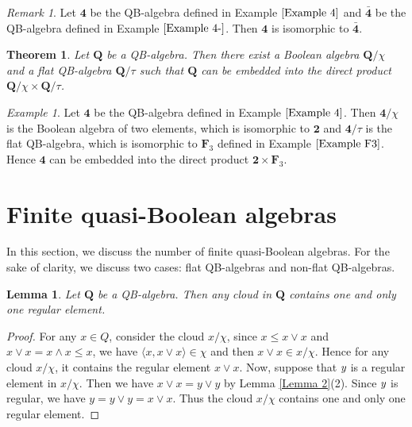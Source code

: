 \documentclass[12pt]{amsart}
\newtheorem{theorem}{Theorem}[section]
\newtheorem{lemma}{Lemma}[section]
\theoremstyle{definition}
\theoremstyle{remark}
\newtheorem{remark}{Remark}[section]
\newtheorem{example}{Example}[section]
\numberwithin{equation}{section}
\begin{document}
\begin{remark}
Let $\mathbf{4}$ be the QB-algebra defined in Example $\ref{Example 4}$ and $\bar{\mathbf{4}}$ be the QB-algebra defined in Example $\ref{Example 4-}$. Then $\mathbf{4}$ is isomorphic to $\bar{\mathbf{4}}$.
\end{remark}

\begin{theorem}\label{Theorem 1}\emph{\cite{QB}}
Let $\mathbf{Q}$ be a QB-algebra. Then there exist a Boolean algebra $\mathbf{Q}/ \chi$ and a flat QB-algebra $\mathbf{Q}/ \tau$ such that $\mathbf{Q}$ can be embedded into the direct product $\mathbf{Q}/ \chi \times \mathbf{Q}/ \tau$.
\end{theorem}


\begin{example}\label{Example 3}
Let $\mathbf{4}$ be the QB-algebra defined in Example $\ref{Example 4}$. Then $\mathbf{4}/ \chi$ is the Boolean algebra of two elements, which is isomorphic to $\mathbf{2}$ and $\mathbf{4}/\tau$ is the flat QB-algebra, which is isomorphic to $\mathbf{F}_{3}$ defined in Example $\ref{Example F3}$. Hence $\mathbf{4}$ can be embedded into the direct product $\mathbf{2}\times \mathbf{F}_{3}$.
\end{example}



\section{Finite quasi-Boolean algebras}

In this section, we discuss the number of finite quasi-Boolean algebras. For the sake of clarity, we discuss two cases: flat QB-algebras and non-flat QB-algebras.

\begin{lemma}\label{Lemma Cloud}
Let $\mathbf{Q}$ be a QB-algebra. Then any cloud in $\mathbf{Q}$ contains one and only one regular element.
\end{lemma}
\begin{proof}
For any $x\in Q$, consider the cloud $x/\chi$, since $x\leq x\vee x$ and $x\vee x=x\wedge x\leq x$, we have $\langle x ,x \vee x\rangle \in \chi$ and then $x \vee x \in x/ \chi$. Hence for any cloud $x/ \chi$, it contains the regular element $x\vee x$. Now, suppose that $\emph{y}$ is a regular element in $x/ \chi$. Then we have $x\vee x=y\vee y$ by Lemma \ref{Lemma 2}(2). Since $\emph{y}$ is regular, we have $y=y\vee y=x\vee x$. Thus the cloud $x/ \chi$ contains one and only one regular element.
\end{proof}
\end{document}
